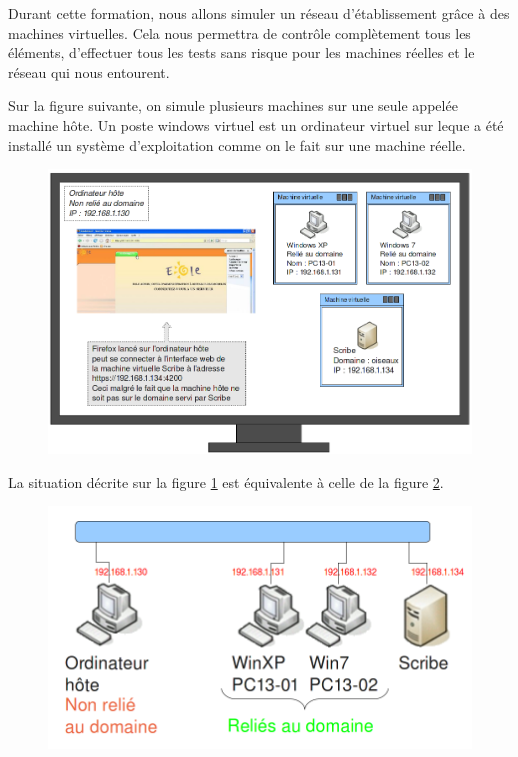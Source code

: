 \documentclass{article}
\makeatletter
\def\maxwidth{\ifdim\Gin@nat@width>\linewidth\linewidth
\else\Gin@nat@width\fi}
\let\Oldincludegraphics\includegraphics
\renewcommand{\includegraphics}[1]{\Oldincludegraphics[width=\maxwidth]{#1}}
\makeatother
\begin{document}
Durant cette formation, nous allons simuler un réseau d'établissement
grâce à des machines virtuelles. Cela nous permettra de contrôle
complètement tous les éléments, d'effectuer tous les tests sans risque
pour les machines réelles et le réseau qui nous entourent.

Sur la figure suivante, on simule plusieurs machines sur une seule
appelée machine hôte. Un poste windows virtuel est un ordinateur virtuel
sur leque a été installé un système d'exploitation comme on le fait sur
une machine réelle.

\begin{figure}[htbp]
\centering
\includegraphics{scribe_html_413f4ff1.png}
\caption{\label{413f4ff1}}
\end{figure}

La situation décrite sur la figure \ref{413f4ff1} est équivalente à
celle de la figure \ref{78733841}.

\begin{figure}[htbp]
\centering
\includegraphics{scribe_html_78733841.png}
\caption{\label{78733841}}
\end{figure}
\end{document}
